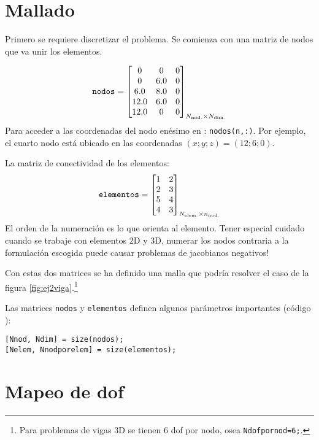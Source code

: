 \section{Mallado}
Primero se requiere discretizar el problema. Se comienza con una matriz de nodos que va unir los elementos. 

\begin{equation}
\texttt{nodos} = \begin{bmatrix}
0 & 0 & 0 \\
0 & 6.0 & 0 \\
6.0 & 8.0 & 0 \\
12.0 & 6.0 & 0 \\
12.0 & 0 & 0
\end{bmatrix}_{ N_{\mathrm{nod.}} \times N_{\mathrm{dim.}} }
\end{equation}
Para acceder a las coordenadas del nodo enésimo en \Matlab: \texttt{nodos(n,:)}. Por ejemplo, el cuarto nodo está ubicado en las coordenadas $(x;y;z)=(12;6;0)$.

La matriz de conectividad de los elementos:
\begin{equation} \label{eq:MatrizElementosEjemplo}
\texttt{elementos} = \begin{bmatrix}
1 & 2  \\
2 & 3  \\
5 & 4 \\
4 & 3 
\end{bmatrix}_{ N_{\mathrm{elem.}} \times n_{\mathrm{nod.}} } 
\end{equation}
El orden de la numeración es lo que orienta al elemento. Tener especial cuidado cuando se trabaje con elementos 2D y 3D, numerar los nodos contraria a la formulación escogida puede causar problemas de jacobianos negativos!

Con estas dos matrices se ha definido una malla que podría resolver el caso de la figura \ref{fig:ej2viga}.\footnote{Para problemas de vigas 3D se tienen 6 dof por nodo, osea \texttt{Ndofpornod=6;}.}

Las matrices \texttt{nodos} y \texttt{elementos} definen algunos parámetros importantes (código \Matlab):
%
\begin{lstlisting}
[Nnod, Ndim] = size(nodos);
[Nelem, Nnodporelem] = size(elementos);
\end{lstlisting}


\section{Mapeo de dof} \label{sec:dofmapping}

